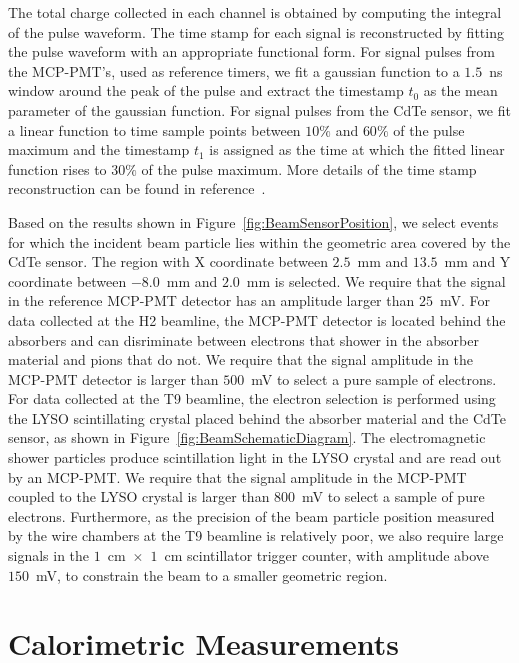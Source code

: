 \documentclass[preprint,1p]{elsarticle}
\begin{document}
The total charge collected in each channel is obtained by computing the integral of the pulse
waveform. The time stamp for each signal is reconstructed by fitting the pulse waveform with
an appropriate functional form. For signal pulses from the MCP-PMT's, used as reference timers, 
we fit a gaussian function to a $1.5$~ns window around the peak of the pulse and extract the 
timestamp $t_{0}$ as the mean parameter of the gaussian function. For signal pulses from the
CdTe sensor, we fit a linear function to time sample points between $10\%$ and $60\%$ of the pulse
maximum and the timestamp $t_{1}$ is assigned as the time at which the fitted linear function
rises to $30\%$ of the pulse maximum. More details of the time stamp reconstruction can be
found in reference~\cite{Anderson:2015gha}.


Based on the results shown in Figure~\ref{fig:BeamSensorPosition}, we select events
for which the incident beam particle lies within the geometric area covered by the 
CdTe sensor. The region with X coordinate between $2.5$~mm and $13.5$~mm and
Y coordinate between $-8.0$~mm and $2.0$~mm is selected. We require that the 
signal in the reference MCP-PMT detector has an amplitude larger than $25$~mV. 
For data collected at the H2 beamline, the MCP-PMT detector is located behind
the absorbers and can disriminate between electrons that shower in the absorber
material and pions that do not. We require that the signal amplitude in the 
MCP-PMT detector is larger than $500$~mV to select a pure sample of electrons. For
data collected at the T9 beamline, the electron selection is performed using
the LYSO scintillating crystal placed behind the absorber material and the CdTe sensor,
as shown in Figure~\ref{fig:BeamSchematicDiagram}. The electromagnetic shower particles produce
scintillation light in the LYSO crystal and are read out by an MCP-PMT. We require that
the signal amplitude in the MCP-PMT coupled to the LYSO crystal is larger than $800$~mV
to select a sample of pure electrons. Furthermore, as the precision of the beam particle position 
measured by the wire chambers at the T9 beamline is relatively poor, we also require
large signals in the $1$~cm~$\times$~$1$~cm scintillator trigger counter, with
amplitude above $150$~mV, to constrain the beam to a smaller geometric region. 


\section{Calorimetric Measurements} 
\label{sec:calorimetery} 
\end{document}
